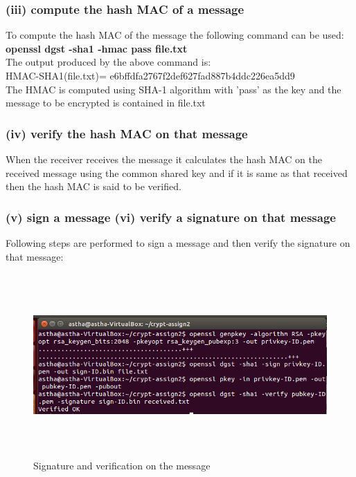 \documentclass{article}
\begin{document}
\subsubsection*{(iii) compute the hash MAC of a message}

\noindent To compute the hash MAC of the message the following command can be used:\\
\textbf{openssl dgst -sha1 -hmac pass file.txt}\\

\noindent The output produced by the above command is:\\
HMAC-SHA1(file.txt)= e6bffdfa2767f2def627fad887b4ddc226ea5dd9\\

\noindent The HMAC is computed using SHA-1 algorithm with 'pass' as the key and the message to be encrypted is contained in file.txt

\subsubsection*{(iv) verify the hash MAC on that message}

\noindent When the receiver receives the message it calculates the hash MAC on the received message using the common shared key and if it is same as that received then the hash MAC is said to be verified.

\subsubsection*{(v) sign a message (vi) verify a signature on that message}

Following steps are performed to sign a message and then verify the signature on that message:

	\begin{figure}[h]
	      \begin{center}
		\includegraphics[width=15cm,height=7cm]{question1b3.png}
		\caption{Signature and verification on the message}
	      \end{center}
	\end{figure}
\end{document}
